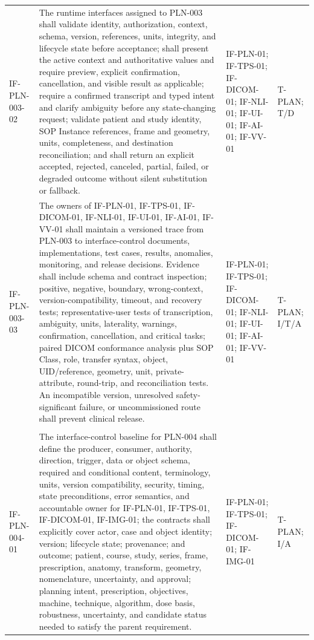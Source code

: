 \documentclass[11pt,letterpaper]{article}
\begin{document}
\begin{scriptsize}
\begin{longtable}{@{}L{0.14\textwidth}L{0.49\textwidth}L{0.19\textwidth}L{0.10\textwidth}@{}}
\addlinespace[2pt]
\mbox{IF-PLN-003-02} & The runtime interfaces assigned to PLN-003 shall validate identity, authorization, context, schema, version, references, units, integrity, and lifecycle state before acceptance; shall present the active context and authoritative values and require preview, explicit confirmation, cancellation, and visible result as applicable; require a confirmed transcript and typed intent and clarify ambiguity before any state-changing request; validate patient and study identity, SOP Instance references, frame and geometry, units, completeness, and destination reconciliation; and shall return an explicit accepted, rejected, canceled, partial, failed, or degraded outcome without silent substitution or fallback. & IF-PLN-01; IF-TPS-01; IF-DICOM-01; IF-NLI-01; IF-UI-01; IF-AI-01; IF-VV-01 & T-PLAN; T\slash\allowbreak{}D \\
\addlinespace[2pt]
\mbox{IF-PLN-003-03} & The owners of IF-PLN-01, IF-TPS-01, IF-DICOM-01, IF-NLI-01, IF-UI-01, IF-AI-01, IF-VV-01 shall maintain a versioned trace from PLN-003 to interface-control documents, implementations, test cases, results, anomalies, monitoring, and release decisions. Evidence shall include schema and contract inspection; positive, negative, boundary, wrong-context, version-compatibility, timeout, and recovery tests; representative-user tests of transcription, ambiguity, units, laterality, warnings, confirmation, cancellation, and critical tasks; paired DICOM conformance analysis plus SOP Class, role, transfer syntax, object, UID\slash\allowbreak{}reference, geometry, unit, private-attribute, round-trip, and reconciliation tests. An incompatible version, unresolved safety-significant failure, or uncommissioned route shall prevent clinical release. & IF-PLN-01; IF-TPS-01; IF-DICOM-01; IF-NLI-01; IF-UI-01; IF-AI-01; IF-VV-01 & T-PLAN; I\slash\allowbreak{}T\slash\allowbreak{}A \\
\addlinespace[2pt]
 \\
\addlinespace[2pt]
\mbox{IF-PLN-004-01} & The interface-control baseline for PLN-004 shall define the producer, consumer, authority, direction, trigger, data or object schema, required and conditional content, terminology, units, version compatibility, security, timing, state preconditions, error semantics, and accountable owner for IF-PLN-01, IF-TPS-01, IF-DICOM-01, IF-IMG-01; the contracts shall explicitly cover actor, case and object identity; version; lifecycle state; provenance; and outcome; patient, course, study, series, frame, prescription, anatomy, transform, geometry, nomenclature, uncertainty, and approval; planning intent, prescription, objectives, machine, technique, algorithm, dose basis, robustness, uncertainty, and candidate status needed to satisfy the parent requirement. & IF-PLN-01; IF-TPS-01; IF-DICOM-01; IF-IMG-01 & T-PLAN; I\slash\allowbreak{}A \\

\end{longtable}
\end{scriptsize}
\end{document}
